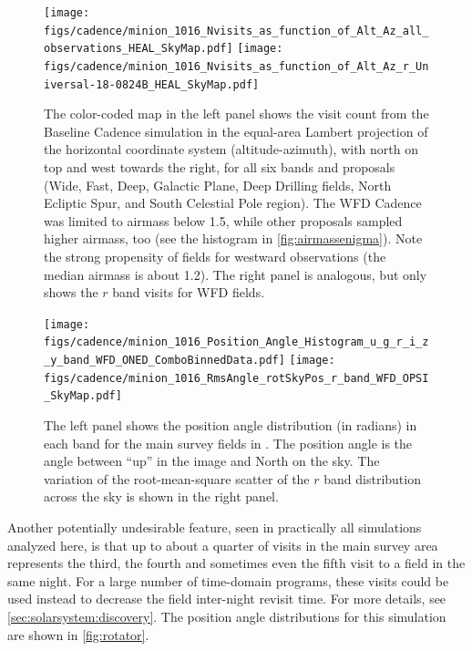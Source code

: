 \begin{figure}[t!]
\vskip -0.0in
\texttt{[image: figs/cadence/minion\_1016\_Nvisits\_as\_function\_of\_Alt\_Az\_all\_observations\_HEAL\_SkyMap.pdf]}
\texttt{[image: figs/cadence/minion\_1016\_Nvisits\_as\_function\_of\_Alt\_Az\_r\_Universal-18-0824B\_HEAL\_SkyMap.pdf]}
\vskip -0.1in
\caption{The color-coded map in the left panel shows the visit count from the
Baseline Cadence simulation  in the equal-area Lambert projection of the
horizontal coordinate system (altitude-azimuth), with north on top and west towards the
right, for all six bands and proposals (Wide, Fast, Deep, Galactic Plane, Deep Drilling
fields, North Ecliptic Spur, and South Celestial Pole region). The WFD Cadence was
limited to airmass below 1.5, while other proposals sampled higher airmass, too (see the
histogram in \autoref{fig:airmassenigma}).  Note the strong propensity of fields
for westward observations (the median airmass is about 1.2). The right panel is analogous,
but only shows the $r$ band visits for WFD fields.}
\label{fig:AltAzenigma}
\end{figure}







\begin{figure}[th!]
\vskip -0.0in
\texttt{[image: figs/cadence/minion\_1016\_Position\_Angle\_Histogram\_u\_g\_r\_i\_z\_y\_band\_WFD\_ONED\_ComboBinnedData.pdf]}
\texttt{[image: figs/cadence/minion\_1016\_RmsAngle\_rotSkyPos\_r\_band\_WFD\_OPSI\_SkyMap.pdf]}
\vskip -0.1in
\caption{The left panel shows the position angle distribution (in radians)  in each band for the
main survey fields in . The position angle is the angle between
``up'' in the image and North on the sky. The variation of the root-mean-square scatter of the
$r$ band distribution across the sky is shown in the right panel.}
\label{fig:rotator}
\end{figure}

Another potentially undesirable feature, seen in practically all
simulations analyzed here, is that up to about a quarter of visits in
the main survey area represents the third, the fourth and sometimes
even the fifth visit to a field in the same night. For a large number
of time-domain programs, these visits could be used instead to
decrease the field inter-night revisit time. For more details, see
\autoref{sec:solarsystem:discovery}. The position angle distributions for this simulation
are shown in \autoref{fig:rotator}.


